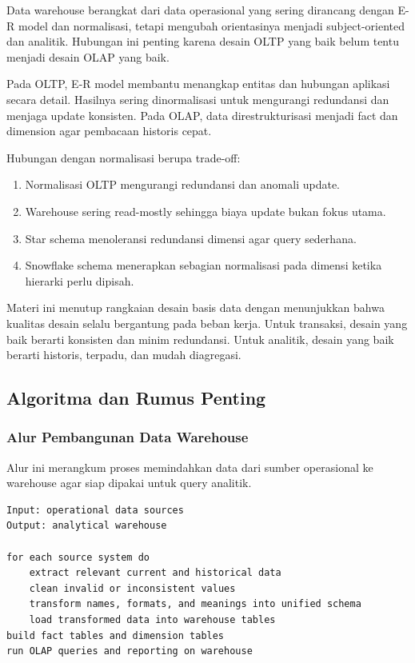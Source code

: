 \begin{jawab}
Data warehouse berangkat dari data operasional yang sering dirancang dengan E-R model dan normalisasi, tetapi mengubah orientasinya menjadi subject-oriented dan analitik. Hubungan ini penting karena desain OLTP yang baik belum tentu menjadi desain OLAP yang baik.
\end{jawab}

Pada OLTP, E-R model membantu menangkap entitas dan hubungan aplikasi secara detail. Hasilnya sering dinormalisasi untuk mengurangi redundansi dan menjaga update konsisten. Pada OLAP, data direstrukturisasi menjadi fact dan dimension agar pembacaan historis cepat.

Hubungan dengan normalisasi berupa trade-off:
\begin{enumerate}
    \item Normalisasi OLTP mengurangi redundansi dan anomali update.
    \item Warehouse sering read-mostly sehingga biaya update bukan fokus utama.
    \item Star schema menoleransi redundansi dimensi agar query sederhana.
    \item Snowflake schema menerapkan sebagian normalisasi pada dimensi ketika hierarki perlu dipisah.
\end{enumerate}

Materi ini menutup rangkaian desain basis data dengan menunjukkan bahwa kualitas desain selalu bergantung pada beban kerja. Untuk transaksi, desain yang baik berarti konsisten dan minim redundansi. Untuk analitik, desain yang baik berarti historis, terpadu, dan mudah diagregasi.

\subsection{Algoritma dan Rumus Penting}

\subsubsection{Alur Pembangunan Data Warehouse}

\begin{jawab}
Alur ini merangkum proses memindahkan data dari sumber operasional ke warehouse agar siap dipakai untuk query analitik.
\end{jawab}

\begin{lstlisting}[caption={Pseudocode alur pembangunan data warehouse}, label={lst:warehouse-flow}]
Input: operational data sources
Output: analytical warehouse

for each source system do
    extract relevant current and historical data
    clean invalid or inconsistent values
    transform names, formats, and meanings into unified schema
    load transformed data into warehouse tables
build fact tables and dimension tables
run OLAP queries and reporting on warehouse
\end{lstlisting}

